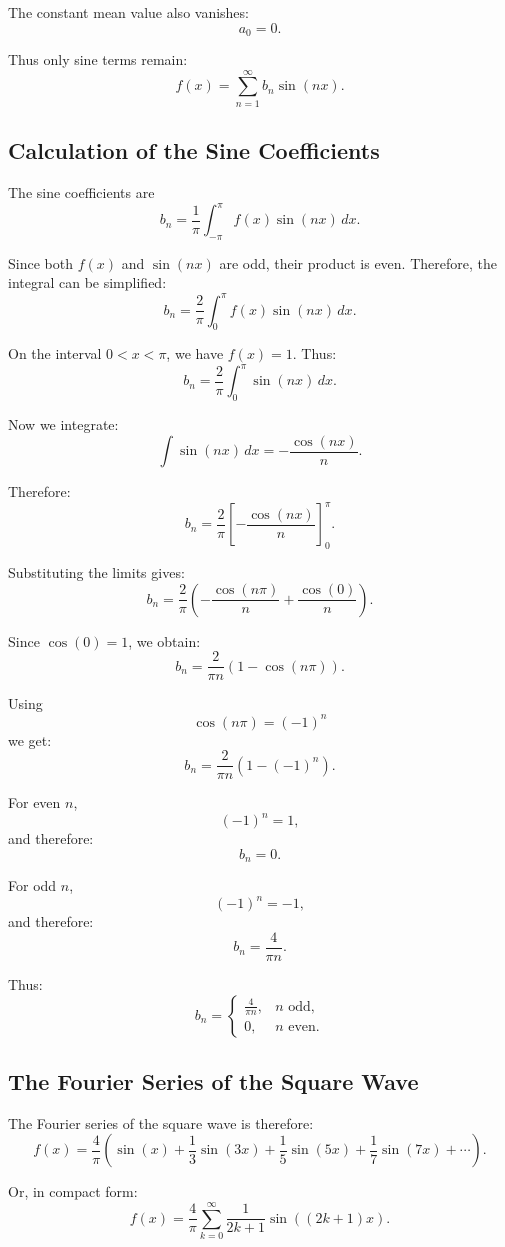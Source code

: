The constant mean value also vanishes:
\[
a_0=0.
\]

Thus only sine terms remain:
\[
f(x)=\sum_{n=1}^{\infty} b_n\sin(nx).
\]

\subsection{Calculation of the Sine Coefficients}

The sine coefficients are
\[
b_n=\frac{1}{\pi}\int_{-\pi}^{\pi}f(x)\sin(nx)\,dx.
\]

Since both \(f(x)\) and \(\sin(nx)\) are odd,
their product is even.
Therefore, the integral can be simplified:
\[
b_n=\frac{2}{\pi}\int_{0}^{\pi}f(x)\sin(nx)\,dx.
\]

On the interval \(0<x<\pi\), we have \(f(x)=1\).
Thus:
\[
b_n=\frac{2}{\pi}\int_{0}^{\pi}\sin(nx)\,dx.
\]

Now we integrate:
\[
\int \sin(nx)\,dx=-\frac{\cos(nx)}{n}.
\]

Therefore:
\[
b_n=\frac{2}{\pi}
\left[
-\frac{\cos(nx)}{n}
\right]_{0}^{\pi}.
\]

Substituting the limits gives:
\[
b_n=\frac{2}{\pi}
\left(
-\frac{\cos(n\pi)}{n}
+\frac{\cos(0)}{n}
\right).
\]

Since \(\cos(0)=1\), we obtain:
\[
b_n=\frac{2}{\pi n}
\left(1-\cos(n\pi)\right).
\]

Using
\[
\cos(n\pi)=(-1)^n
\]
we get:
\[
b_n=\frac{2}{\pi n}
\left(1-(-1)^n\right).
\]

For even \(n\),
\[
(-1)^n=1,
\]
and therefore:
\[
b_n=0.
\]

For odd \(n\),
\[
(-1)^n=-1,
\]
and therefore:
\[
b_n=\frac{4}{\pi n}.
\]

Thus:
\[
b_n=
\begin{cases}
	\frac{4}{\pi n}, & n \text{ odd},\\
	0, & n \text{ even}.
\end{cases}
\]

\subsection{The Fourier Series of the Square Wave}

The Fourier series of the square wave is therefore:
\[
f(x)=\frac{4}{\pi}
\left(
\sin(x)
+\frac{1}{3}\sin(3x)
+\frac{1}{5}\sin(5x)
+\frac{1}{7}\sin(7x)
+\cdots
\right).
\]

Or, in compact form:
\[
f(x)=\frac{4}{\pi}
\sum_{k=0}^{\infty}
\frac{1}{2k+1}
\sin\left((2k+1)x\right).
\]


